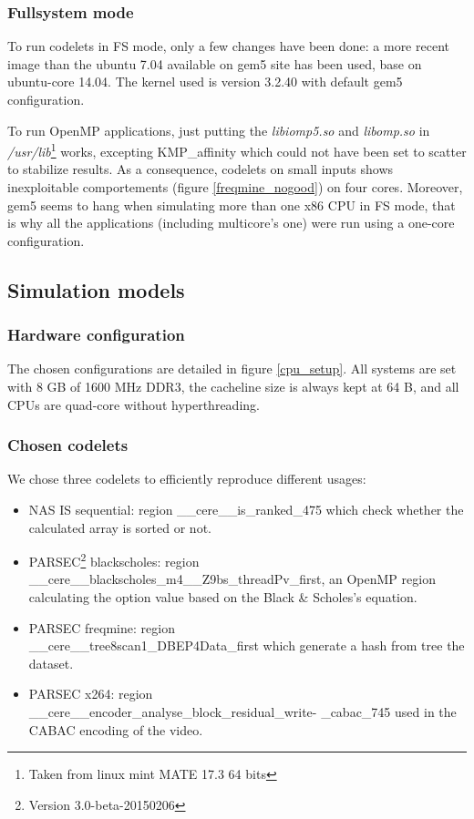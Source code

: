 \documentclass{article}
\begin{document}
\begin{multicols}{2}


\subsubsection{Fullsystem mode}
\label{FS_mode}
To run codelets in FS mode, only a few changes have been done: a more recent image than the ubuntu 7.04 available on gem5 site has been used, base on ubuntu-core 14.04. The kernel used is version 3.2.40 with default gem5 configuration.


To run OpenMP applications, just putting the \textit{libiomp5.so} and \textit{libomp.so} in \textit{/usr/lib}\footnote{Taken from linux mint MATE 17.3 64 bits} works, excepting KMP\_affinity which could not have been set to scatter to stabilize results. As a consequence, codelets on small inputs shows inexploitable comportements (figure \ref{freqmine_nogood}) on four cores. Moreover, gem5 seems to hang when simulating more than one x86 CPU in FS mode, that is why all the applications (including multicore's one) were run using a one-core configuration.

\subsection{Simulation models}
\subsubsection{Hardware configuration}
The chosen configurations are detailed in figure \ref{cpu_setup}. All systems are set with 8 GB of 1600 MHz DDR3, the cacheline size is always kept at 64 B, and all CPUs are quad-core without hyperthreading.

\subsubsection{Chosen codelets}
We chose three codelets to efficiently reproduce different usages:
\begin{itemize}
\item NAS IS sequential: region \_\_cere\_\_is\_ranked\_475 which check whether the calculated array is sorted or not.
\item PARSEC\footnote{Version 3.0-beta-20150206} blackscholes: region \\ \_\_cere\_\_blackscholes\_m4\_\_Z9bs\_threadPv\_first, an OpenMP region calculating the option value based on the Black \& Scholes's equation.
\item PARSEC freqmine: region\\ \_\_cere\_\_tree8scan1\_DBEP4Data\_first which generate a hash from tree the dataset.
\item PARSEC x264: region \\ \_\_cere\_\_encoder\_analyse\_block\_residual\_write- \_cabac\_745 used in the CABAC encoding of the video.
\end{itemize}



\end{multicols}
\end{document}
